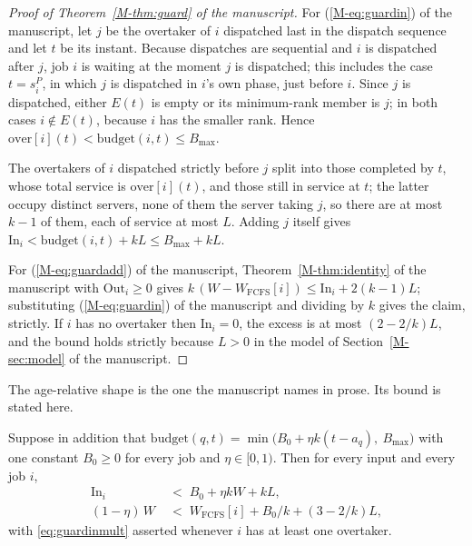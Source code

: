 \documentclass[mathematics,supfile,submit,moreauthors]{Definitions/mdpi}
\begin{document}
\begin{proof}[Proof of Theorem~\ref*{M-thm:guard} of the manuscript]
For (\ref*{M-eq:guardin}) of the manuscript, let $j$ be the overtaker of $i$ dispatched last in the
dispatch sequence and let $t$ be its instant. Because dispatches are sequential
and $i$ is dispatched after $j$, job $i$ is waiting at the moment $j$ is
dispatched; this includes the case $t = s^P_i$, in which $j$ is dispatched in
$i$'s own phase, just before $i$. Since $j$ is dispatched, either $E(t)$ is empty
or its minimum-rank member is $j$; in both cases $i \notin E(t)$, because $i$ has
the smaller rank. Hence
$\mathrm{over}[i](t) < \mathrm{budget}(i,t) \le B_{\max}$.

The overtakers of $i$ dispatched strictly before $j$ split into those completed
by $t$, whose total service is $\mathrm{over}[i](t)$, and those still in service
at $t$; the latter occupy distinct servers, none of them the server taking $j$,
so there are at most $k-1$ of them, each of service at most $L$. Adding $j$
itself gives $\mathrm{In}_i < \mathrm{budget}(i,t) + kL \le B_{\max} + kL$.

For (\ref*{M-eq:guardadd}) of the manuscript, Theorem~\ref*{M-thm:identity} of the manuscript with
$\mathrm{Out}_i \ge 0$ gives
$k\,(W - W_{\mathrm{FCFS}}[i]) \le \mathrm{In}_i + 2(k-1)L$; substituting
(\ref*{M-eq:guardin}) of the manuscript and dividing by $k$ gives the claim, strictly. If $i$ has no
overtaker then $\mathrm{In}_i = 0$, the excess is at most $(2 - 2/k)L$, and the
bound holds strictly because $L > 0$ in the model of Section~\ref*{M-sec:model} of the manuscript.
\end{proof}

The age-relative shape is the one the manuscript names in prose. Its bound is stated
here.

\begin{proposition}
\label{prop:guardmult}
Suppose in addition that
$\mathrm{budget}(q,t) = \min\bigl(B_0 + \eta k (t - a_q),\ B_{\max}\bigr)$ with
one constant $B_0 \ge 0$ for every job and $\eta \in [0,1)$. Then for every
input and every job $i$,
\begin{align}
  \mathrm{In}_i &\;<\; B_0 + \eta k W + kL ,
  \label{eq:guardinmult}\\
  (1 - \eta)\,W &\;<\; W_{\mathrm{FCFS}}[i] + B_0/k + (3 - 2/k)L ,
  \label{eq:guardmult}
\end{align}
with \eqref{eq:guardinmult} asserted whenever $i$ has at least one overtaker.
\end{proposition}
\end{document}
